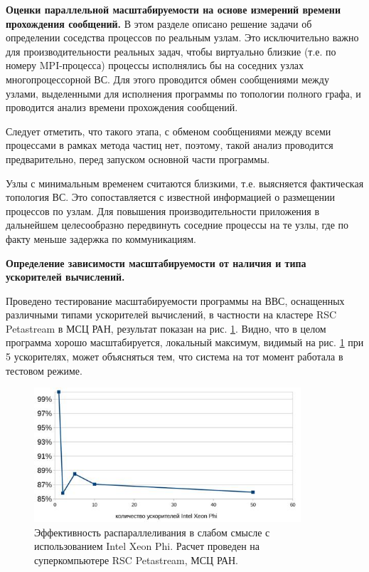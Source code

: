 \textbf{Оценки параллельной масштабируемости на основе измерений времени прохождения сообщений.}
В этом разделе описано решение задачи об определении соседства процессов по реальным узлам. Это исключительно важно для производительности реальных задач, чтобы виртуально близкие (т.е. по номеру MPI-процесса) процессы исполнялись бы на соседних узлах многопроцессорной ВС. Для этого проводится обмен сообщениями между узлами, выделенными 
для исполнения программы по топологии полного графа, и проводится анализ времени прохождения сообщений.  

Следует отметить, что такого этапа, с обменом сообщениями между всеми процессами в рамках метода частиц нет, поэтому, такой анализ проводится предварительно, перед запуском основной части программы.



Узлы с минимальным временем считаются близкими, т.е. выясняется фактическая топология ВС. Это сопоставляется с известной информацией о размещении процессов по узлам.	Для повышения производительности приложения в дальнейшем целесообразно передвинуть соседние процессы на те узлы, где по факту меньше задержка по коммуникациям.




\textbf{Определение зависимости масштабируемости от наличия и типа ускорителей вычислений.}

Проведено тестирование масштабируемости программы на ВВС, оснащенных различными типами ускорителей вычислений, в частности на кластере RSC Petastream в МСЦ РАН, результат показан на рис. \ref{phi100}. Видно, что в целом программа хорошо масштабируется, локальный максимум, видимый на рис. \ref{phi100} при 5 ускорителях, может объясняться тем, что система на тот момент работала в тестовом режиме.

\begin{figure}[htb]
	\begin{center}
		\includegraphics[height=5cm,keepaspectratio]{images/petastream_phi100.jpg}
	\end{center}
	\caption{Эффективность распараллеливания в слабом смысле с использованием Intel Xeon Phi. Расчет проведен на суперкомпьютере RSC Petastream, МСЦ РАН.}
	\label{phi100}
\end{figure}

